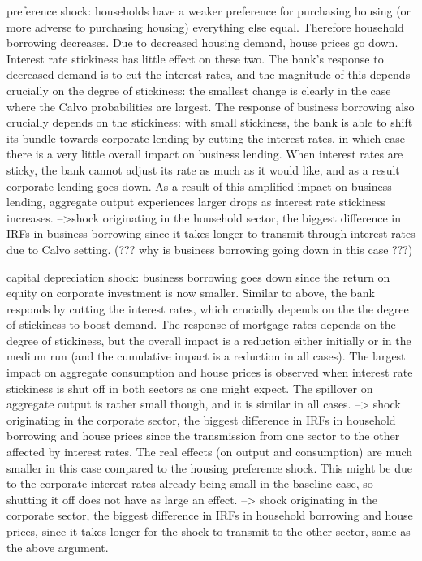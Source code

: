 \documentclass[12pt]{article}
\numberwithin{equation}{section}
\begin{document}
preference shock: households have a weaker preference for purchasing housing (or more adverse to purchasing housing) everything else equal. Therefore household borrowing decreases. Due to decreased housing demand, house prices go down. Interest rate stickiness has little effect on these two. The bank's response to decreased demand is to cut the interest rates, and the magnitude of this depends crucially on the degree of stickiness: the smallest change is clearly in the case where the Calvo probabilities are largest. The response of business borrowing also crucially depends on the stickiness: with small stickiness, the bank is able to shift its bundle towards corporate lending by cutting the interest rates, in which case there is a very little overall impact on business lending. When interest rates are sticky, the bank cannot adjust its rate as much as it would like, and as a result corporate lending goes down. As a result of this amplified impact on business lending, aggregate output  experiences larger drops as interest rate stickiness increases.
-->shock originating in the household sector, the biggest difference in IRFs in business borrowing since it takes longer to transmit through interest rates due to Calvo setting. 
(??? why is business borrowing going down in this case ???)


capital depreciation shock: business borrowing goes down since the return on equity on corporate investment is now smaller. Similar to above, the bank responds by cutting the interest rates, which crucially depends on the the degree of stickiness to boost demand. The response of mortgage rates depends on the degree of stickiness, but the overall impact is a reduction either initially or in the medium run (and the cumulative impact is a reduction in all cases). 
The largest impact on aggregate consumption and house prices is observed when interest rate stickiness is shut off in both sectors as one might expect. The spillover on aggregate output is rather small though, and it is similar in all cases. 
--> shock originating in the corporate sector, the biggest difference in IRFs in household borrowing and house prices since the transmission from one sector to the other affected by interest rates. The real effects (on output and consumption) are much smaller in this case compared to the housing preference shock. This might be due to the corporate interest rates already being small in the baseline case, so shutting it off does not have as large an effect.
--> shock originating in the corporate sector, the biggest difference in IRFs in household borrowing and house prices, since it takes longer for the shock to transmit to the other sector, same as the above argument.
\end{document}
